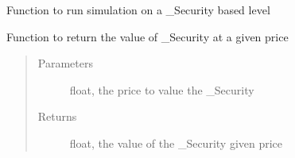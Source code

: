 \documentclass[letterpaper,10pt,english]{sphinxmanual}
\begin{document}
\begin{fulllineitems}
\begin{fulllineitems}
\begin{quote}
\begin{description}
\end{description}\end{quote}

\end{fulllineitems}


\begin{fulllineitems}
\label{\detokenize{securities:risk_dash.securities._Security.simulate}}
\sphinxAtStartPar
Function to run simulation on a \_Security based level

\end{fulllineitems}


\begin{fulllineitems}
\label{\detokenize{securities:risk_dash.securities._Security.valuation}}
\sphinxAtStartPar
Function to return the value of \_Security at a given price
\begin{quote}\begin{description}
\item[{Parameters}] \leavevmode
\sphinxAtStartPar
{} \textendash{} float, the price to value the \_Security

\item[{Returns}] \leavevmode
\sphinxAtStartPar
float, the value of the \_Security given price

\end{description}\end{quote}

\end{fulllineitems}


\end{fulllineitems}

\end{document}
